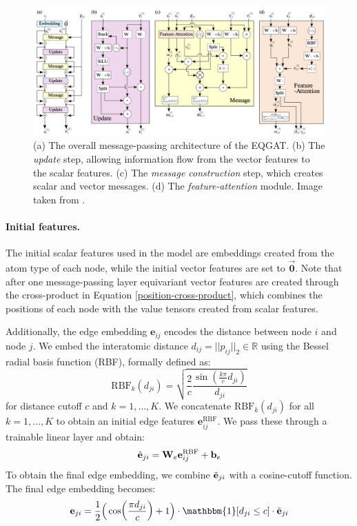 \begin{figure}
    \centering
    \includegraphics[width=\textwidth]{masters-report/figures/eqgat_diagram.png}
    \caption{(a) The overall message-passing architecture of the EQGAT. (b) The \textit{update} step, allowing information flow from the vector features to the scalar features. (c) The \textit{message construction} step, which creates scalar and vector messages. (d) The \textit{feature-attention} module. Image taken from \cite{eqgat}. }
    \label{eqgat}
\end{figure}

\paragraph{Initial features.}
The initial scalar features used in the model are embeddings created from the atom type of each node, while the initial vector features are set to $\vec{\mathbf{0}}$. Note that after one message-passing layer equivariant vector features are created through the cross-product in Equation \ref{position-cross-product}, which combines the positions of each node with the value tensors created from scalar features. 

Additionally, the edge embedding $\mathbf{e}_{ij}$ encodes the distance between node $i$ and node $j$. We embed the interatomic distance $d_{ij} = ||p_{ij}||_2 \in \mathbb{R}$ using the Bessel radial basis function (RBF), formally defined as:
\begin{equation}
    \text{RBF}_k(d_{ji}) = \sqrt{\frac{2}{c}\frac{\sin(\frac{k\pi}{c}d_{ji})}{d_{ji}}}
\end{equation}
for distance cutoff $c$ and $k = 1, \dots, K$. We concatenate $\text{RBF}_k(d_{ji})$ for all $k = 1,\dots,K$ to obtain an initial edge features $\mathbf{e}^{\text{RBF}}_{ij}$. We pass these through a trainable linear layer and obtain:
\begin{equation}
    \Tilde{\mathbf{e}}_{ji} = \mathbf{W}_e\mathbf{e}^{\text{RBF}}_{ij} + \mathbf{b}_e
\end{equation}
To obtain the final edge embedding, we combine $\Tilde{\mathbf{e}}_{ji}$ with a cosine-cutoff function. The final edge embedding becomes:
\begin{equation}
    \mathbf{e}_{ji} = \frac{1}{2}\Big(\cos (\frac{\pi d_{ji}}{c}) + 1\Big)\cdot \mathbbm{1}[d_{ji}\leq c]\cdot \Tilde{\mathbf{e}}_{ji}
\end{equation}


